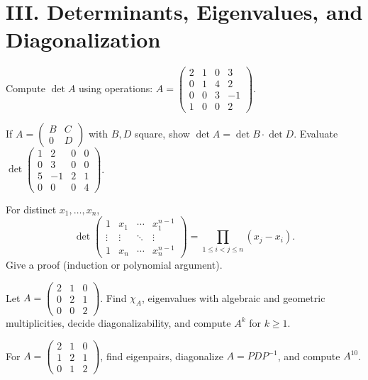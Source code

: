 \documentclass[11pt]{article}
\begin{document}
\section*{III. Determinants, Eigenvalues, and Diagonalization}

\begin{problem}
Compute $\det A$ using operations:
$A=\begin{pmatrix}2&1&0&3\\ 0&1&4&2\\ 0&0&3&-1\\ 1&0&0&2\end{pmatrix}$.
\end{problem}

\begin{problem}
If $A=\begin{pmatrix}B&C\\0&D\end{pmatrix}$ with $B,D$ square, show $\det A=\det B\cdot\det D$.
Evaluate $\det\begin{pmatrix}1&2&0&0\\0&3&0&0\\5&-1&2&1\\0&0&0&4\end{pmatrix}$.
\end{problem}

\begin{problem}[Vandermonde]
For distinct $x_1,\dots,x_n$,
\[
\det\begin{pmatrix}
1&x_1&\cdots&x_1^{n-1}\\
\vdots&\vdots&\ddots&\vdots\\
1&x_n&\cdots&x_n^{n-1}
\end{pmatrix}
=\prod_{1\le i<j\le n}(x_j-x_i).
\]
Give a proof (induction or polynomial argument).
\end{problem}

\begin{problem}
Let $A=\begin{pmatrix}2&1&0\\0&2&1\\0&0&2\end{pmatrix}$. 
Find $\chi_A$, eigenvalues with algebraic and geometric multiplicities, decide diagonalizability, and compute $A^k$ for $k\ge 1$.
\end{problem}

\begin{problem}
For $A=\begin{pmatrix}2&1&0\\1&2&1\\0&1&2\end{pmatrix}$, find eigenpairs, diagonalize $A=PDP^{-1}$, and compute $A^{10}$.
\end{problem}
\end{document}
